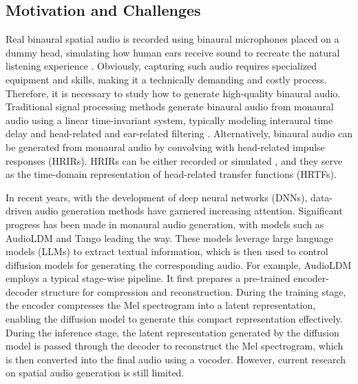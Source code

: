 \documentclass{IEEEtran}
\begin{document}
\subsection{Motivation and Challenges}
Real binaural spatial audio is recorded using binaural microphones placed on a dummy head, simulating how human ears receive sound  to recreate the natural listening experience \cite{hammershoi2002methods}. Obviously, capturing such audio requires specialized equipment and skills, making it a technically demanding and costly process. Therefore, it is necessary to study how to generate high-quality binaural audio. Traditional signal processing methods generate binaural audio from monaural audio using a linear time-invariant system, typically modeling interaural time delay and head-related and ear-related filtering \cite{jianjun2015natural}. Alternatively, binaural audio can be generated from monaural audio by convolving with head-related impulse responses (HRIRs). HRIRs can be either recorded or simulated \cite{brinkmann2019cross}, and they serve as the time-domain representation of head-related transfer functions (HRTFs).

In recent years, with the development of deep neural networks (DNNs), data-driven audio generation methods have garnered increasing attention. Significant progress has been made in monaural audio generation, with models such as AudioLDM \cite{liu2023audioldm,liu2024audioldm} and Tango \cite{ghosal2023tango,majumder2024tango} leading the way. These models leverage large language models (LLMs) \cite{wu2023large,radford2019language,chung2024scaling,achiam2023gpt} to extract textual information, which is then used to control diffusion models for generating the corresponding audio. For example, AudioLDM employs a typical stage-wise pipeline. It first prepares a pre-trained encoder-decoder structure for compression and reconstruction. During the training stage, the encoder compresses the Mel spectrogram into a latent representation, enabling the diffusion model to generate this compact representation effectively. During the inference stage, the latent representation generated by the diffusion model is passed through the decoder to reconstruct the Mel spectrogram, which is then converted into the final audio using a vocoder. However, current research on spatial audio generation is still limited.
\end{document}
